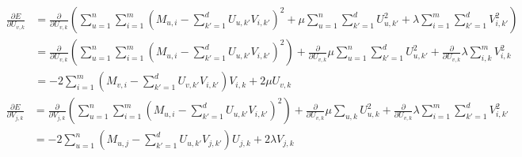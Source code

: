 \documentclass{article}
\begin{document}
\begin{align*}
    \frac{\partial E}{\partial U_{v,k}} &= \frac{\partial}{\partial U_{v,k}}\left(\sum_{u=1}^n\sum_{i=1}^m{(M_{u,i} - \sum_{k'=1}^d{U_{u,k'}V_{i,k'}})^2} + \mu\sum_{u=1}^n\sum_{k'=1}^d{U_{u,k'}^2} + \lambda\sum_{i=1}^m\sum_{k'=1}^d{V_{i,k'}^2}\right)\\
    &= \frac{\partial}{\partial U_{v,k}}\left(\sum_{u=1}^n\sum_{i=1}^m{(M_{u,i} - \sum_{k'=1}^d{U_{u,k'}V_{i,k'}})^2}\right) + \frac{\partial}{\partial U_{v,k}}\mu\sum_{u=1}^n\sum_{k'=1}^d{U_{u,k'}^2} + \frac{\partial}{\partial U_{v,k}}\lambda\sum_{i,k}^m{V_{i,k}^2}\\
    &= -2\sum_{i=1}^m{(M_{v,i} - \sum_{k'=1}^d{U_{v,k'}V_{i,k'}})V_{i,k}} + 2\mu U_{v,k}
\end{align*}
\begin{align*}
    \frac{\partial E}{\partial V_{j,k}} &= \frac{\partial}{\partial V_{j,k}}\left(\sum_{u=1}^n\sum_{i=1}^m{(M_{u,i} - \sum_{k'=1}^d{U_{u,k'}V_{i,k'}})^2}\right) + \frac{\partial}{\partial U_{v,k}}\mu\sum_{u, k}{U_{u,k}^2} + \frac{\partial}{\partial U_{v,k}}\lambda\sum_{i=1}^m\sum_{k'=1}^d{V_{i,k'}^2}\\
    &= -2\sum_{u=1}^n{(M_{u,j} - \sum_{k'=1}^d{U_{u,k'}V_{j,k'}})U_{j,k}} + 2\lambda V_{j,k}
\end{align*}
\end{document}
